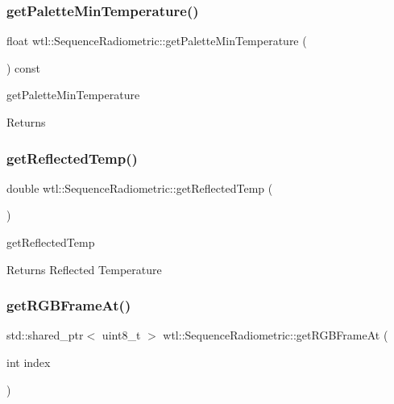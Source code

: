 \subsubsection{\texorpdfstring{get\+Palette\+Min\+Temperature()}{getPaletteMinTemperature()}}
{\footnotesize\ttfamily float wtl\+::\+Sequence\+Radiometric\+::get\+Palette\+Min\+Temperature (\begin{DoxyParamCaption}{ }\end{DoxyParamCaption}) const}



get\+Palette\+Min\+Temperature 

\begin{DoxyReturn}{Returns}

\end{DoxyReturn}
\mbox{\label{classwtl_1_1_sequence_radiometric_a1ea0a824608afd40f7dfda8c8539a269}} 
\subsubsection{\texorpdfstring{get\+Reflected\+Temp()}{getReflectedTemp()}}
{\footnotesize\ttfamily double wtl\+::\+Sequence\+Radiometric\+::get\+Reflected\+Temp (\begin{DoxyParamCaption}{ }\end{DoxyParamCaption})}



get\+Reflected\+Temp 

\begin{DoxyReturn}{Returns}
Reflected Temperature 
\end{DoxyReturn}
\mbox{\label{classwtl_1_1_sequence_radiometric_af0503fb4a89d9a356a4a68bad6da976d}} 
\subsubsection{\texorpdfstring{get\+R\+G\+B\+Frame\+At()}{getRGBFrameAt()}}
{\footnotesize\ttfamily std\+::shared\+\_\+ptr$<$ uint8\+\_\+t $>$ wtl\+::\+Sequence\+Radiometric\+::get\+R\+G\+B\+Frame\+At (\begin{DoxyParamCaption}\item[{int}]{index }\end{DoxyParamCaption})\hspace{0.3cm}{\ttfamily [virtual]}}



